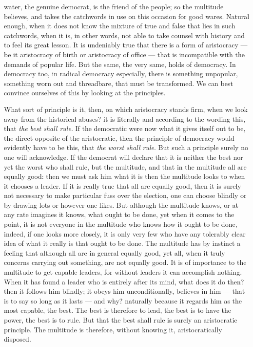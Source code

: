 \documentclass[12pt,a4paper,openany]{book}
\newcommand{\opage}[1]{\marginnote{\footnotesize\textit{[#1]}}}
\begin{document}
water, the genuine democrat, is the friend of the people; so the multitude
believes, and takes the catchwords in use on this occasion
for good wares. Natural enough, when it does not
know the mixture of true and false that lies in
such catchwords, when it is, in other words, not
able to take counsel with history and to feel
its great lesson. It is undeniably true that there
is a form of aristocracy --- be it aristocracy of birth
or aristocracy of office --- that is incompatible
with the demands of popular life. But the same, the
very same, holds of democracy. In democracy too,
in radical democracy especially, there is something
unpopular, something worn out and threadbare, that must be transformed.
We can best convince ourselves of this by
looking at the principles.

What sort of principle is it, then, on which
aristocracy stands firm, when we look away from the historical
abuses? it is literally and according to the wording this,
that \emph{the best shall rule}. If the democratic
were now what it gives itself out to be, the direct opposite
of the aristocratic, then the principle of democracy
would evidently have to be this, that \emph{the worst
shall rule}. But such a principle
surely no one will acknowledge. If the democrat will declare
that it is neither the best nor yet the worst
who shall rule, but the multitude, and that in the multitude
all are equally good: then we must ask him what
\setcounter{footnote}{0}%
\opage{77}it is then the multitude looks to when it chooses a
leader. If it is really true that all are equally
good, then it is surely not necessary to make particular
fuss over the election, one can choose blindly or
by drawing lots or however one likes. But although
the multitude knows, or at any rate imagines it knows,
what ought to be done, yet when it comes to the point,
it is not everyone in the multitude who knows how
it ought to be done, indeed, if one looks more closely, it is
only very few who have any tolerably clear idea
of what it really is that ought to be done. The multitude
has by instinct a feeling that although all
are in general equally good, yet
all, when it truly concerns carrying out something,
are not equally good. It is of importance to the multitude to get
capable leaders, for without leaders it can accomplish nothing.
When it has found a leader who is entirely
after its mind, what does it do then? then it follows
him blindly; it obeys him unconditionally, believes in
him --- that is to say so long as it lasts --- and why?
naturally because it regards him as the most capable,
the best. The best is therefore to lead, the
best is to have the power, the best is to rule.
But that the best shall rule is surely an aristocratic
principle. The multitude is therefore, without knowing it,
aristocratically disposed.
\end{document}
